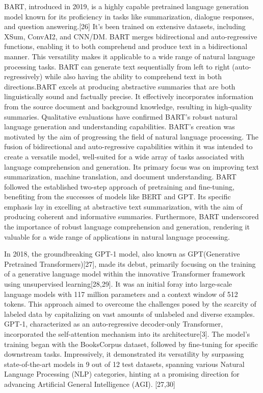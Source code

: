 \documentclass[fleqn,10pt]{thescipub} %
\begin{document}
BART, introduced in 2019, is a highly capable pretrained language generation model known for its proficiency in tasks like summarization, dialogue responses, and question answering.[26] It's been trained on extensive datasets, including XSum, ConvAI2, and CNN/DM. BART merges bidirectional and auto-regressive functions, enabling it to both comprehend and produce text in a bidirectional manner. This versatility makes it applicable to a wide range of natural language processing tasks. BART can generate text sequentially from left to right (auto-regressively) while also having the ability to comprehend text in both directions.BART excels at producing abstractive summaries that are both linguistically sound and factually precise. It effectively incorporates information from the source document and background knowledge, resulting in high-quality summaries. Qualitative evaluations have confirmed BART's robust natural language generation and understanding capabilities.
BART's creation was motivated by the aim of progressing the field of natural language processing. The fusion of bidirectional and auto-regressive capabilities within it was intended to create a versatile model, well-suited for a wide array of tasks associated with language comprehension and generation. Its primary focus was on improving text summarization, machine translation, and document understanding. BART followed the established two-step approach of pretraining and fine-tuning, benefiting from the successes of models like BERT and GPT. Its specific emphasis lay in excelling at abstractive text summarization, with the aim of producing coherent and informative summaries. Furthermore, BART underscored the importance of robust language comprehension and generation, rendering it valuable for a wide range of applications in natural language processing.



In 2018, the groundbreaking GPT-1 model, also known as GPT(Generative Pretrained Transformers)[27], made its debut, primarily focusing on the training of a generative language model within the innovative Transformer framework using unsupervised learning[28,29]. It was an initial foray into large-scale language models with 117 million parameters and a context window of 512 tokens. This approach aimed to overcome the challenges posed by the scarcity of labeled data by capitalizing on vast amounts of unlabeled and diverse examples. GPT-1, characterized as an auto-regressive decoder-only Transformer, incorporated the self-attention mechanism into its architecture[3]. The model's training began with the BooksCorpus dataset, followed by fine-tuning for specific downstream tasks. Impressively, it demonstrated its versatility by surpassing state-of-the-art models in 9 out of 12 test datasets, spanning various Natural Language Processing (NLP) categories, hinting at a promising direction for advancing Artificial General Intelligence (AGI). [27,30]
\end{document}
